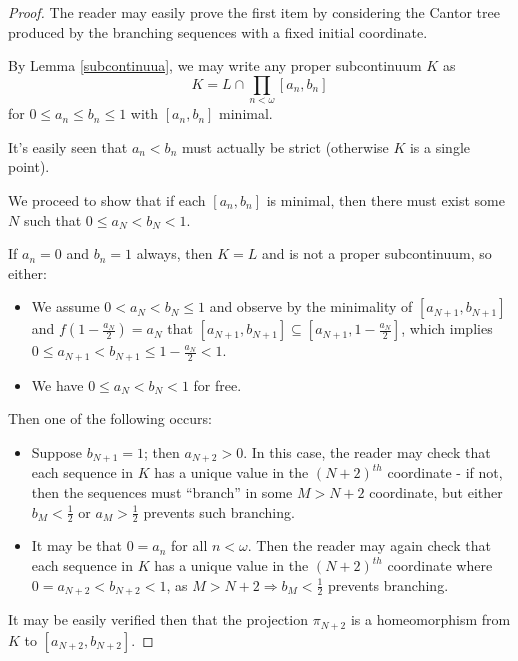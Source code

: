 \begin{proof}
The reader may easily prove the first item by considering the Cantor tree produced by the branching sequences with a fixed initial coordinate.

By Lemma \ref{subcontinuua}, we may write any proper subcontinuum $K$ as
  \[
    K = L \cap \prod_{n<\omega} [a_n,b_n] 
  \]
for $0\leq a_n \leq b_n \leq 1$ with $[a_n,b_n]$ minimal.

It's easily seen that $a_n < b_n$ must actually be strict (otherwise $K$ is a single point).

We proceed to show that if each $[a_n,b_n]$ is minimal, then there must exist some $N$ such that $0\leq a_N < b_N < 1$.

If $a_n=0$ and $b_n=1$ always, then $K=L$ and is not a proper subcontinuum, so either:
  \begin{itemize}
    \item We assume $0< a_N < b_N \leq 1$ and observe by the minimality of $[a_{N+1},b_{N+1}]$ and $f(1-\frac{a_N}{2})=a_N$ that $[a_{N+1},b_{N+1}]\subseteq[a_{N+1},1-\frac{a_N}{2}]$, which implies $0\leq a_{N+1} < b_{N+1} \leq 1 - \frac{a_N}{2} < 1$.
    \item We have $0\leq a_N < b_N < 1$ for free.
  \end{itemize}
Then one of the following occurs:
  \begin{itemize}
    \item Suppose $b_{N+1}=1$; then $a_{N+2}>0$. In this case, the reader may check that each sequence in $K$ has a unique value in the $(N+2)^{th}$ coordinate - if not, then the sequences must ``branch'' in some $M>N+2$ coordinate, but either $b_M<\frac{1}{2}$ or $a_M>\frac{1}{2}$ prevents such branching.
    \item It may be that $0=a_n$ for all $n<\omega$. Then the reader may again check that each sequence in $K$ has a unique value in the $(N+2)^{th}$ coordinate where $0=a_{N+2}<b_{N+2}<1$, as $M>N+2 \Rightarrow b_M<\frac{1}{2}$ prevents branching.
  \end{itemize}

It may be easily verified then that the projection $\pi_{N+2}$ is a homeomorphism from $K$ to $[a_{N+2},b_{N+2}]$.
\end{proof}


